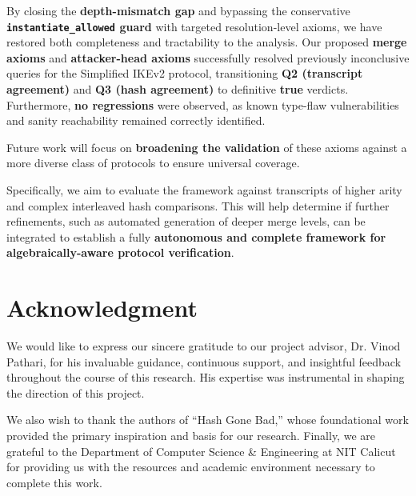 \documentclass[journal]{IEEEtran}
\begin{document}
By closing the \textbf{depth-mismatch gap} and bypassing the conservative \textbf{\texttt{instantiate\_allowed} guard} with targeted resolution-level axioms, we have restored both completeness and tractability to the analysis. Our proposed \textbf{merge axioms} and \textbf{attacker-head axioms} successfully resolved previously inconclusive queries for the Simplified IKEv2 protocol, transitioning \textbf{Q2 (transcript agreement)} and \textbf{Q3 (hash agreement)} to definitive \textbf{true} verdicts. Furthermore, \textbf{no regressions} were observed, as known type-flaw vulnerabilities and sanity reachability remained correctly identified.

\vspace{0.3cm} 

Future work will focus on \textbf{broadening the validation} of these axioms against a more diverse class of protocols to ensure universal coverage. 



Specifically, we aim to evaluate the framework against transcripts of higher arity and complex interleaved hash comparisons. This will help determine if further refinements, such as automated generation of deeper merge levels, can be integrated to establish a fully \textbf{autonomous and complete framework for algebraically-aware protocol verification}.












\section*{Acknowledgment}

We would like to express our sincere gratitude to our project advisor, Dr. Vinod Pathari, for his invaluable guidance, continuous support, and insightful feedback throughout the course of this research. His expertise was instrumental in shaping the direction of this project.

We also wish to thank the authors of ``Hash Gone Bad,'' \cite{cheval2023hash} whose foundational work provided the primary inspiration and basis for our research. Finally, we are grateful to the Department of Computer Science \& Engineering at NIT Calicut for providing us with the resources and academic environment necessary to complete this work.
\end{document}
